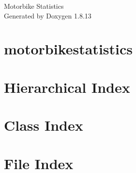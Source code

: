 \documentclass[twoside]{book}
\newcommand{\+}{\discretionary{\mbox{\scriptsize$\hookleftarrow$}}{}{}}
\newcommand{\clearemptydoublepage}{%
  \newpage{\pagestyle{empty}\cleardoublepage}%
}
\begin{document}
\hypersetup{pageanchor=false,
             bookmarksnumbered=true,
             pdfencoding=unicode
            }
\begin{titlepage}
\vspace*{7cm}
\begin{center}%
{\Large Motorbike Statistics }\\
\vspace*{1cm}
{\large Generated by Doxygen 1.8.13}\\
\end{center}
\end{titlepage}
\clearemptydoublepage
{}
\tableofcontents
\clearemptydoublepage
{}
\hypersetup{pageanchor=true}

\chapter{motorbikestatistics}
\label{index}\hypertarget{index}{}
\chapter{Hierarchical Index}

\chapter{Class Index}

\chapter{File Index}

\end{document}
